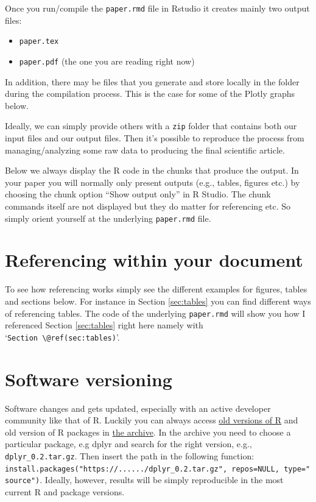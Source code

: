 \documentclass[
  12pt,
]{article}
\providecommand{\tightlist}{%
  \setlength{\itemsep}{0pt}\setlength{\parskip}{0pt}}
\begin{document}
Once you run/compile the \texttt{paper.rmd} file in Rstudio it creates mainly two output files:

\begin{itemize}
\tightlist
\item
  \texttt{paper.tex}
\item
  \texttt{paper.pdf} (the one you are reading right now)
\end{itemize}

In addition, there may be files that you generate and store locally in the folder during the compilation process. This is the case for some of the Plotly graphs below.

Ideally, we can simply provide others with a \texttt{zip} folder that contains both our input files and our output files. Then it's possible to reproduce the process from managing/analyzing some raw data to producing the final scientific article.

Below we always display the R code in the chunks that produce the output. In your paper you will normally only present outputs (e.g., tables, figures etc.) by choosing the chunk option ``Show output only'' in R Studio. The chunk commands itself are not displayed but they do matter for referencing etc. So simply orient yourself at the underlying \texttt{paper.rmd} file.

\hypertarget{referencing-within-your-document}{%
\section{Referencing within your document}\label{referencing-within-your-document}}

To see how referencing works simply see the different examples for figures, tables and sections below. For instance in Section \ref{sec:tables} you can find different ways of referencing tables. The code of the underlying \texttt{paper.rmd} will show you how I referenced Section \ref{sec:tables} right here namely with `\texttt{Section\ \textbackslash{}@ref(sec:tables)}'.

\hypertarget{software-versioning}{%
\section{Software versioning}\label{software-versioning}}

Software changes and gets updated, especially with an active developer community like that of R. Luckily you can always access \href{https://cran.r-project.org/bin/windows/base/old/}{old versions of R} and old version of R packages in \href{https://cran.r-project.org/src/contrib/Archive/}{the archive}. In the archive you need to choose a particular package, e.g dplyr and search for the right version, e.g., \texttt{dplyr\_0.2.tar.gz}. Then insert the path in the following function: \texttt{install.packages("https://....../dplyr\_0.2.tar.gz",\ repos=NULL,\ type="source")}. Ideally, however, results will be simply reproducible in the most current R and package versions.
\end{document}
